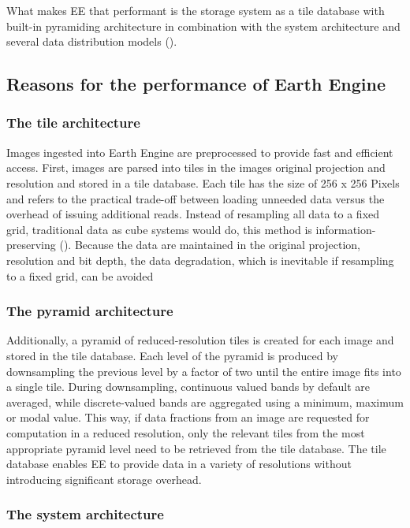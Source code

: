 What makes EE that performant is the storage system as a tile database with built-in pyramiding architecture in combination with the system architecture and several data distribution models (\cite{gorelick2017google}).

\subsection{Reasons for the performance of Earth Engine}

\subsubsection{The tile architecture}

Images ingested into Earth Engine are preprocessed to provide fast and efficient access. First, images are parsed into tiles in the images original projection and resolution and stored in a tile database. Each tile has the size of 256 x 256 Pixels and refers to the practical trade-off between loading unneeded data versus the overhead of issuing additional reads. Instead of resampling all data to a fixed grid, traditional data as cube systems would do, this method is information-preserving (\cite{gray1997data}). Because the data are maintained in the original projection, resolution and bit depth, the data degradation, which is inevitable if resampling to a fixed grid, can be avoided

\subsubsection{The pyramid architecture}

Additionally, a pyramid of reduced-resolution tiles is created for each image and stored in the tile database. Each level of the pyramid is produced by downsampling the previous level by a factor of two until the entire image fits into a single tile. During downsampling, continuous valued bands by default are averaged, while discrete-valued bands are aggregated using a minimum, maximum or modal value. This way, if data fractions from an image are requested for computation in a reduced resolution, only the relevant tiles from the most appropriate pyramid level need to be retrieved from the tile database. The tile database enables EE to provide data in a variety of resolutions without introducing significant storage overhead.

\subsubsection{The system architecture}

